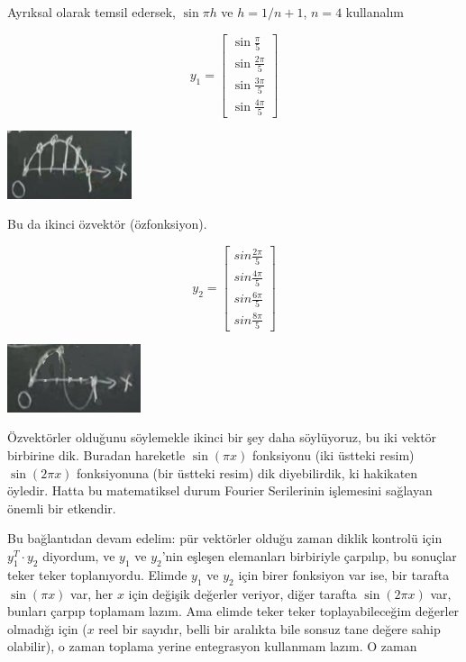 \documentclass[12pt,fleqn]{article}\usepackage{../../common}
\begin{document}
Ayrıksal olarak temsil edersek, $\sin\pi h$ ve $h = 1 / n+1$, $n = 4$
kullanalım

$$ 
y_1 = 
\left[\begin{array}{c}
\sin \frac{\pi}{5} \\
\sin \frac{2\pi}{5} \\
\sin \frac{3\pi}{5} \\
\sin \frac{4\pi}{5} 
\end{array}\right]
 $$

\includegraphics[height=2cm]{6_2.png}

Bu da ikinci özvektör (özfonksiyon). 

$$ 
y_2 = 
\left[\begin{array}{c}
sin \frac{2\pi}{5} \\
sin \frac{4\pi}{5} \\
sin \frac{6\pi}{5} \\
sin \frac{8\pi}{5} 
\end{array}\right]
 $$

\includegraphics[height=2cm]{6_3.png}

Özvektörler olduğunu söylemekle ikinci bir şey daha söylüyoruz, bu iki
vektör birbirine dik. Buradan hareketle $\sin(\pi x)$ fonksiyonu (iki
üstteki resim) $\sin(2\pi x)$ fonksiyonuna (bir üstteki resim) dik
diyebilirdik, ki hakikaten öyledir. Hatta bu matematiksel durum Fourier
Serilerinin işlemesini sağlayan önemli bir etkendir.

Bu bağlantıdan devam edelim: pür vektörler olduğu zaman diklik kontrolü için
$y_1^T \cdot y_2$ diyordum, ve $y_1$ ve $y_2$'nin eşleşen elemanları birbiriyle 
çarpılıp, bu sonuçlar teker teker toplanıyordu. Elimde $y_1$ ve $y_2$ için 
birer fonksiyon var ise, bir tarafta $\sin(\pi x)$ var, her $x$ için değişik
değerler veriyor, diğer tarafta $\sin(2\pi x)$ var, bunları çarpıp toplamam
lazım. Ama elimde teker teker toplayabileceğim değerler olmadığı için ($x$ reel
bir sayıdır, belli bir aralıkta bile sonsuz tane değere sahip olabilir), o
zaman toplama yerine entegrasyon kullanmam lazım. O zaman
\end{document}
